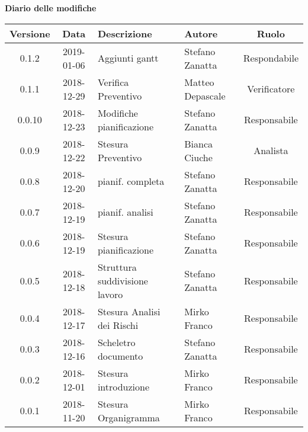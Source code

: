 	\begin{center}
		\textbf{Diario delle modifiche}
	\end{center}
	\begin{center}
		\begin{tabularx}{\textwidth}{|c|c|X|X|c|}
			\hline
			\textbf{Versione} & \textbf{Data} & \textbf{Descrizione} & \textbf{Autore} & \textbf{Ruolo} \\
			\hline
			0.1.2 & 2019-01-06 & Aggiunti gantt & Stefano Zanatta & Respondabile\\
			\hline
			0.1.1 & 2018-12-29 & Verifica Preventivo & Matteo Depascale & Verificatore\\
			\hline
			0.0.10 & 2018-12-23 & Modifiche pianificazione & Stefano Zanatta & Responsabile\\
			\hline
			0.0.9 & 2018-12-22 & Stesura Preventivo & Bianca Ciuche & Analista\\
			\hline
			0.0.8 & 2018-12-20 & pianif. completa& Stefano Zanatta & Responsabile\\
			\hline
			0.0.7 & 2018-12-19 & pianif. analisi& Stefano Zanatta & Responsabile\\
			\hline
			0.0.6 & 2018-12-19 & Stesura pianificazione & Stefano Zanatta & Responsabile\\
			\hline
			0.0.5 & 2018-12-18 & Struttura suddivisione lavoro & Stefano Zanatta & Responsabile\\
			\hline
			0.0.4 & 2018-12-17 & Stesura Analisi dei Rischi & Mirko Franco & Responsabile\\
			\hline
			0.0.3 & 2018-12-16 & Scheletro documento &Stefano Zanatta & Responsabile\\
			\hline
			0.0.2 & 2018-12-01 & Stesura introduzione & Mirko Franco & Responsabile\\
			\hline
			0.0.1 & 2018-11-20 & Stesura Organigramma & Mirko Franco & Responsabile\\			
			\hline
			
		\end{tabularx}
	\end{center}
\newpage